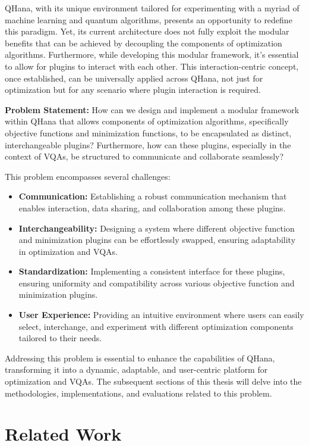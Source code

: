 \documentclass[
  a4paper,  %
  twoside,  %
  bibliography=totoc,
  headsepline,
  cleardoublepage=empty,
  parskip=half,
  draft=false
]{scrbook}
\begin{document}
QHana, with its unique environment tailored for experimenting with a myriad of machine learning and quantum algorithms, presents an opportunity to redefine this paradigm.
Yet, its current architecture does not fully exploit the modular benefits that can be achieved by decoupling the components of optimization algorithms.
Furthermore, while developing this modular framework, it's essential to allow for plugins to interact with each other.
This interaction-centric concept, once established, can be universally applied across QHana, not just for optimization but for any scenario where plugin interaction is required.

\textbf{Problem Statement:}
How can we design and implement a modular framework within QHana that allows components of optimization algorithms, specifically objective functions and minimization functions, to be encapsulated as distinct, interchangeable plugins?
Furthermore, how can these plugins, especially in the context of VQAs, be structured to communicate and collaborate seamlessly?

This problem encompasses several challenges:

\begin{itemize}
    \item \textbf{Communication:} Establishing a robust communication mechanism that enables interaction, data sharing, and collaboration among these plugins.
    \item \textbf{Interchangeability:} Designing a system where different objective function and minimization plugins can be effortlessly swapped, ensuring adaptability in optimization and VQAs.
    \item \textbf{Standardization:} Implementing a consistent interface for these plugins, ensuring uniformity and compatibility across various objective function and minimization plugins.
    \item \textbf{User Experience:} Providing an intuitive environment where users can easily select, interchange, and experiment with different optimization components tailored to their needs.
\end{itemize}

Addressing this problem is essential to enhance the capabilities of QHana, transforming it into a dynamic, adaptable, and user-centric platform for optimization and VQAs.
The subsequent sections of this thesis will delve into the methodologies, implementations, and evaluations related to this problem.

\chapter{Related Work}
\end{document}
